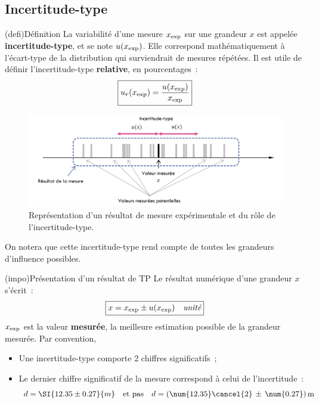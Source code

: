 \documentclass[../main/main.tex]{subfiles}
\begin{document}
\subsection{Incertitude-type}
\begin{tcb}[sidebyside, righthand ratio=.3](defi){Définition}
	La variabilité d'une mesure $x_{\rm exp}$ sur une grandeur $x$ est appelée
	\textbf{incertitude-type}, et se note $u(x_{\rm exp})$. Elle correspond
	mathématiquement à l'écart-type de la distribution qui surviendrait de mesures
	répétées.
	\tcblower
	Il est utile de définir l'incertitude-type \textbf{relative}, en
	pourcentages~:
	\[
		\boxed{u_r(x_{\rm exp}) = \frac{u(x_{\rm exp})}{x_{\rm exp}}}
	\]
\end{tcb}
\begin{figure}[htbp]
	\centering
	\includegraphics[scale=1]{inctype}
	\caption{Représentation d'un résultat de mesure expérimentale et du rôle de
		l'incertitude-type.}
	\label{fig:inctype}
\end{figure}
On notera que cette incertitude-type rend compte de toutes les grandeurs
d'influence possibles.

\begin{tcb}[sidebyside, lefthand ratio=.4](impo){Présentation d'un résultat de
			TP}
	Le résultat numérique d'une grandeur $x$ s'écrit~:
	\[
		\boxed{x = x_{\rm exp} \pm u(x_{\rm exp}) \quad \textit{unité}}
	\]
	$x_{\rm exp}$ est la valeur \textbf{mesurée}, la meilleure estimation possible
	de la grandeur mesurée.
	\tcblower
	Par convention,
	\begin{itemize}[label=$\diamond$, leftmargin=10pt]
		\item Une incertitude-type comporte 2 chiffres significatifs~;
		\item Le dernier chiffre significatif de la mesure correspond à celui de
		      l'incertitude~:
		      \[
			      d = \SI{12.35\pm0.27}{m}
			      \quad \text{et pas} \quad
			      d = (\num{12.35}\cancel{2}\,\pm\,\num{0.27})\,\rm  m
		      \]
	\end{itemize}
\end{tcb}
\end{document}
